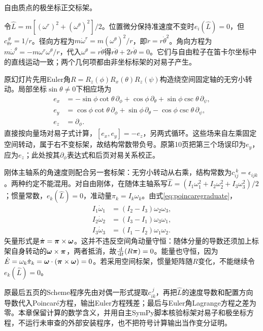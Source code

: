 \begin{example}
自由质点的极坐标正交标架。
\end{example}
\begin{solution}
令$\widehat L=m[(\omega^r)^2+(\omega^\theta)^2]/2$。位置微分保持准速度不变时$e_i(\widehat L)=0$，但$c_{\theta r}^{\ \theta}=1/r$。径向方程为$m\dot\omega^r=m(\omega^\theta)^2/r$，即$\ddot r=r\dot\theta^2$。角向方程为$m\dot\omega^\theta=-m\omega^r\omega^\theta/r$，代入$\omega^\theta=r\dot\theta$得$r\ddot\theta+2\dot r\dot\theta=0$。它们与自由粒子在笛卡尔坐标中的直线运动一致；两个几何项都由非坐标标架的对易子产生。
\end{solution}

原幻灯片先用Euler角$R=R_z(\phi)R_x(\theta)R_z(\psi)$构造绕空间固定轴的无穷小转动。局部坐标$\sin\theta\ne0$下相应场为
\[
\begin{aligned}
 e_x&=-\sin\phi\cot\theta\,\partial_\phi+
 \cos\phi\,\partial_\theta+\sin\phi\csc\theta\,\partial_\psi,\\
 e_y&=\cos\phi\cot\theta\,\partial_\phi+
 \sin\phi\,\partial_\theta-\cos\phi\csc\theta\,\partial_\psi,\\
 e_z&=\partial_\phi.
\end{aligned}
\]
直接按向量场对易子式计算，$[e_x,e_y]=-e_z$，另两式循环。这些场来自左乘固定空间转动，属于右不变标架，故结构常数带负号。原第10页把第三个场误印为$e_y$，应为$e_z$；此处按其$\partial_\phi$表达式和后页对易关系校正。

刚体主轴系的角速度则配合另一套标架：无穷小转动从右乘，结构常数为$c_{ij}^{\ k}=\epsilon_{ijk}$。两种约定不能混用。对自由刚体，在随体主轴系写$\widehat L=(I_1\omega_1^2+I_2\omega_2^2+I_3\omega_3^2)/2$；惯量常数，$e_k(\widehat L)=0$，准动量$\pi_k=I_k\omega_k$。由式\eqref{eq:poincaregraduate}，
\[
\begin{aligned}
 I_1\dot\omega_1&=(I_2-I_3)\omega_2\omega_3,\\
 I_2\dot\omega_2&=(I_3-I_1)\omega_3\omega_1,\\
 I_3\dot\omega_3&=(I_1-I_2)\omega_1\omega_2.
\end{aligned}
\]
矢量形式是$\dot{\boldsymbol{\pi}}=\boldsymbol{\pi}\times\boldsymbol{\omega}$。这并不违反空间角动量守恒：随体分量的导数还须加上标架自身转动的$\boldsymbol{\omega}\times\boldsymbol{\pi}$，两者抵消，故$\frac{\,\mathrm d}{\,\mathrm d t}(R\boldsymbol{\pi})=0$。能量也守恒，因为$\dot E=\omega_k\dot\pi_k=\boldsymbol{\omega}\cdot(\boldsymbol{\pi}\times\boldsymbol{\omega})=0$。若采用空间标架，惯量矩阵随$R$变化，不能继续令$e_k(\widehat L)=0$。

原最后五页的Scheme程序先由对偶一形式提取$c_{ik}^{\ j}$，再把$\widehat L$的速度导数和配置方向导数代入Poincaré方程，输出Euler方程残差；最后与Euler角Lagrange方程之差为零。本章保留计算的数学含义，并用自主SymPy脚本核验标架对易子和极坐标方程，不运行未审查的外部安装程序，也不把符号计算输出当作变分证明。

